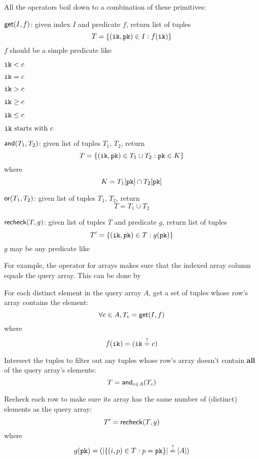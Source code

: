 \documentclass[11pt]{article}
\begin{document}
All the operators boil down to a combination of these primitives:

\begin{oparts}
\item
  $\mathsf{get}(I, f)$:
  given index $I$ and predicate $f$, return list of tuples
  \[
    T = \lbrace(\mathtt{ik}, \mathtt{pk}) \in I : f(\mathtt{ik})\rbrace
  \]
  $f$ should be a simple predicate like
  \begin{oparts}
  \item
    $\mathtt{ik} < c$
  \item
    $\mathtt{ik} = c$
  \item
    $\mathtt{ik} > c$
  \item
    $\mathtt{ik} \geq c$
  \item
    $\mathtt{ik} \leq c$
  \item
    $\mathtt{ik}~\textnormal{starts with}~c$
  \end{oparts}
\item
  $\mathsf{and}(T_1, T_2)$:
  given list of tuples $T_1$, $T_2$, return
  \[
    T = \lbrace(\mathtt{ik}, \mathtt{pk}) \in T_1 \cup T_2 : \mathtt{pk} \in K\rbrace
  \]
  where
  \[
    K = T_1[\mathtt{pk}] \cap T_2[\mathtt{pk}]
  \]
\item
  $\mathsf{or}(T_1, T_2)$:
  given list of tuples $T_1$, $T_2$, return
  \[
    T = T_1 \cup T_2
  \]
\item
  $\mathsf{recheck}(T, g)$:
  given list of tuples $T$ and predicate $g$, return list of tuples
  \[
    T' = \lbrace(\mathtt{ik}, \mathtt{pk}) \in T : g(\mathtt{pk})\rbrace
  \]
  $g$ may be any predicate like
  \begin{oparts}
  \item
  \item
  \end{oparts}
\end{oparts}

For example, the \sqlinline{=} operator for arrays makes sure that the indexed
array column equals the query array. This can be done by

\begin{nparts}
\item
  For each distinct element in the query array $A$, get a set of tuples whose
  row's array contains the element:
  \[
    \forall c \in A, T_c = \mathsf{get}(I, f)
  \]
  where
  \[
    f(\mathtt{ik}) = \lparen\mathtt{ik} \overset{?}{=} c\rparen
  \]
\item
  Intersect the tuples to filter out any tuples whose row's array doesn't
  contain \textbf{all} of the query array's elements:
  \[
    T = \mathsf{and}_{c \in A}(T_c)
  \]
\item
  Recheck each row to make sure its array has the same number of (distinct)
  elements as the query array:
  \[
    T' = \mathsf{recheck}(T, g)
  \]
  where
  \[
    g(\mathtt{pk}) = \lparen\lvert\lbrace(i, p) \in T : p = \mathtt{pk}\rbrace\rvert \overset{?}{=}
    \lvert A\rvert\rparen
  \]
\end{nparts}
\end{document}
